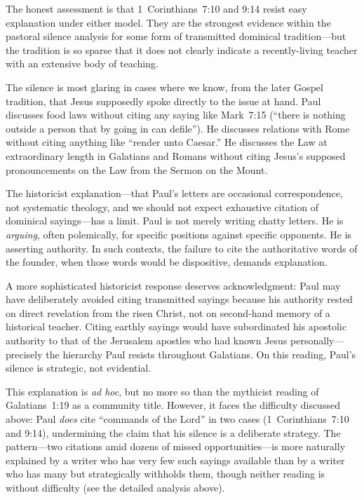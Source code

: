 \documentclass[12pt,oneside]{article}
\begin{document}
The honest assessment is that 1~Corinthians~7:10 and 9:14 resist easy
explanation under either model.  They are the strongest evidence within
the pastoral silence analysis for some form of transmitted dominical
tradition---but the tradition is so sparse that it does not clearly
indicate a recently-living teacher with an extensive body of teaching.

The silence is most glaring in cases where we know, from the later
Gospel tradition, that Jesus supposedly spoke directly to the issue at
hand.  Paul discusses food laws without citing any saying like Mark~7:15
(``there is nothing outside a person that by going in can defile'').  He
discusses relations with Rome without citing anything like ``render unto
Caesar.''  He discusses the Law at extraordinary length in Galatians and
Romans without citing Jesus's supposed pronouncements on the Law from
the Sermon on the Mount.

The historicist explanation---that Paul's letters are occasional
correspondence, not systematic theology, and we should not expect
exhaustive citation of dominical sayings---has a limit.  Paul is not
merely writing chatty letters.  He is \textit{arguing}, often
polemically, for specific positions against specific opponents.  He is
asserting authority.  In such contexts, the failure to cite the
authoritative words of the founder, when those words would be
dispositive, demands explanation.

A more sophisticated historicist response deserves acknowledgment: Paul
may have deliberately avoided citing transmitted sayings because his
authority rested on direct revelation from the risen Christ, not on
second-hand memory of a historical teacher.  Citing earthly sayings
would have subordinated his apostolic authority to that of the Jerusalem
apostles who had known Jesus personally---precisely the hierarchy Paul
resists throughout Galatians.  On this reading, Paul's silence is
strategic, not evidential.

This explanation is \textit{ad hoc}, but no more so than the mythicist
reading of Galatians~1:19 as a community title.  However, it faces the
difficulty discussed above: Paul \textit{does} cite ``commands of the
Lord'' in two cases (1~Corinthians~7:10 and 9:14), undermining the
claim that his silence is a deliberate strategy.  The
pattern---two citations amid dozens of missed opportunities---is more
naturally explained by a writer who has very few such sayings available
than by a writer who has many but strategically withholds them, though
neither reading is without difficulty (see the detailed analysis above).
\end{document}
